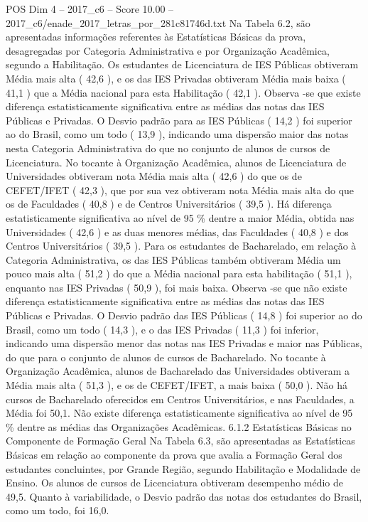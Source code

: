 \begin{textsample}{POS Dim 4 – 2017\_c6 – Score 10.00 – 2017\_c6/enade\_2017\_letras\_por\_281c81746d.txt}
Na Tabela 6.2, são apresentadas informações referentes às Estatísticas Básicas da prova, desagregadas por Categoria Administrativa e por Organização Acadêmica, segundo a Habilitação.
Os estudantes de Licenciatura de IES Públicas obtiveram Média mais alta ( 42,6 ), e os das IES Privadas obtiveram Média mais baixa ( 41,1 ) que a Média nacional para esta Habilitação ( 42,1 ).
Observa -se que existe diferença estatisticamente significativa entre as médias das notas das IES Públicas e Privadas.
O Desvio padrão para as IES Públicas ( 14,2 ) foi superior ao do Brasil, como um todo ( 13,9 ), indicando uma dispersão maior das notas nesta Categoria Administrativa do que no conjunto de alunos de cursos de Licenciatura.
No tocante à Organização Acadêmica, alunos de Licenciatura de Universidades obtiveram nota Média mais alta ( 42,6 ) do que os de CEFET/IFET ( 42,3 ), que por sua vez obtiveram nota Média mais alta do que os de Faculdades ( 40,8 ) e de Centros Universitários ( 39,5 ).
Há diferença estatisticamente significativa ao nível de 95 \% dentre a maior Média, obtida nas Universidades ( 42,6 ) e as duas menores médias, das Faculdades ( 40,8 ) e dos Centros Universitários ( 39,5 ).
Para os estudantes de Bacharelado, em relação à Categoria Administrativa, os das IES Públicas também obtiveram Média um pouco mais alta ( 51,2 ) do que a Média nacional para esta habilitação ( 51,1 ), enquanto nas IES Privadas ( 50,9 ), foi mais baixa.
Observa -se que não existe diferença estatisticamente significativa entre as médias das notas das IES Públicas e Privadas.
O Desvio padrão das IES Públicas ( 14,8 ) foi superior ao do Brasil, como um todo ( 14,3 ), e o das IES Privadas ( 11,3 ) foi inferior, indicando uma dispersão menor das notas nas IES Privadas e maior nas Públicas, do que para o conjunto de alunos de cursos de Bacharelado.
No tocante à Organização Acadêmica, alunos de Bacharelado das Universidades obtiveram a Média mais alta ( 51,3 ), e os de CEFET/IFET, a mais baixa ( 50,0 ).
Não há cursos de Bacharelado oferecidos em Centros Universitários, e nas Faculdades, a Média foi 50,1.
Não existe diferença estatisticamente significativa ao nível de 95 \% dentre as médias das Organizações Acadêmicas. 6.1.2 Estatísticas Básicas no Componente de Formação Geral Na Tabela 6.3, são apresentadas as Estatísticas Básicas em relação ao componente da prova que avalia a Formação Geral dos estudantes concluintes, por Grande Região, segundo Habilitação e Modalidade de Ensino.
Os alunos de cursos de Licenciatura obtiveram desempenho médio de 49,5.
Quanto à variabilidade, o Desvio padrão das notas dos estudantes do Brasil, como um todo, foi 16,0.

\end{textsample}
